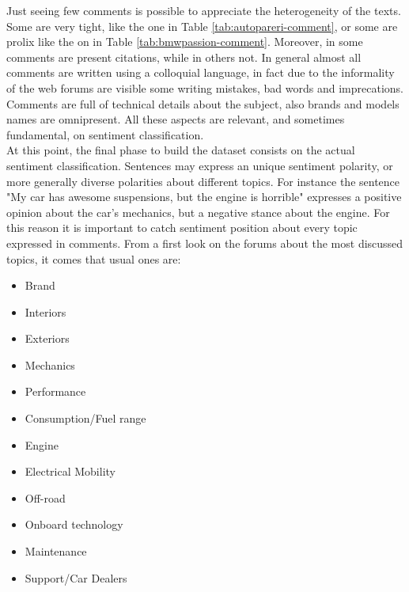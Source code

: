 Just seeing few comments is possible to appreciate the heterogeneity of the texts. Some are very tight, like the one in Table \ref{tab:autopareri-comment}, or some are prolix like the on in Table \ref{tab:bmwpassion-comment}. Moreover, in some comments are present citations, while in others not. In general almost all comments are written using a colloquial language, in fact due to the informality of the web forums are visible some writing mistakes, bad words and imprecations. Comments are full of technical details about the subject, also brands and models names are omnipresent. All these aspects are relevant, and sometimes fundamental, on sentiment classification.\\

At this point, the final phase to build the dataset consists on the actual sentiment classification. Sentences may express an unique sentiment polarity, or more generally diverse polarities about different topics. For instance the sentence "My car has awesome suspensions, but the engine is horrible" expresses a positive opinion about the car's mechanics, but a negative stance about the engine. For this reason it is important to catch sentiment position about every topic expressed in comments. From a first look on the forums about the most discussed topics, it comes that usual ones are:

\begin{itemize}
	\item Brand
	\item Interiors
	\item Exteriors
	\item Mechanics
	\item Performance
	\item Consumption/Fuel range
	\item Engine
	\item Electrical Mobility
	\item Off-road
	\item Onboard technology
	\item Maintenance
	\item Support/Car Dealers
\end{itemize}

